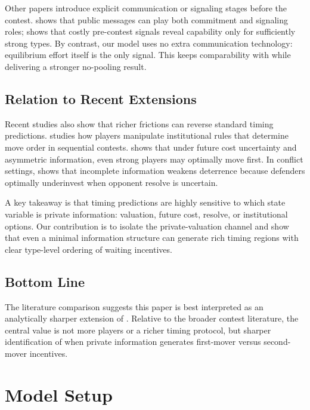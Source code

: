 \documentclass[
  english,
  a4paper,
  12pt]{article}
\theoremstyle{plain}
\theoremstyle{plain}
\theoremstyle{definition}
\theoremstyle{remark}
\begin{document}
Other papers introduce explicit communication or signaling stages before
the contest. \citet{fu2013} shows that public messages can play both
commitment and signaling roles; \citet{dentermorgansisak2022} shows that
costly pre-contest signals reveal capability only for sufficiently
strong types. By contrast, our model uses no extra communication
technology: equilibrium effort itself is the only signal. This keeps
comparability with \citet{fu2006} while delivering a stronger no-pooling
result.

\subsection{Relation to Recent
Extensions}\label{relation-to-recent-extensions}

Recent studies also show that richer frictions can reverse standard
timing predictions. \citet{protopappas2023} studies how players
manipulate institutional rules that determine move order in sequential
contests. \citet{protopappas2025} shows that under future cost
uncertainty and asymmetric information, even strong players may
optimally move first. In conflict settings, \citet{dentersisak2015}
shows that incomplete information weakens deterrence because defenders
optimally underinvest when opponent resolve is uncertain.

A key takeaway is that timing predictions are highly sensitive to which
state variable is private information: valuation, future cost, resolve,
or institutional options. Our contribution is to isolate the
private-valuation channel and show that even a minimal information
structure can generate rich timing regions with clear type-level
ordering of waiting incentives.

\subsection{Bottom Line}\label{bottom-line}

The literature comparison suggests this paper is best interpreted as an
analytically sharper extension of \citet{fu2006}. Relative to the
broader contest literature, the central value is not more players or a
richer timing protocol, but sharper identification of when private
information generates first-mover versus second-mover incentives.

\section{Model Setup}\label{sec-setup}
\end{document}

